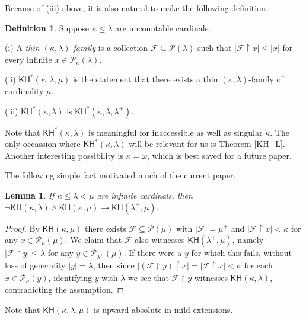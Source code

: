 \documentclass[10pt,reqno]{amsart}
\theoremstyle{plain}
\newtheorem{lemma}[theorem]{Lemma}
\theoremstyle{definition}
\newtheorem{definition}[theorem]{Definition}
\theoremstyle{remark}
\begin{document}
Because of (iii) above, it is also natural to make the following definition. 

\begin{definition}\label{KH*}
Suppose $\kappa\leq\lambda$ are uncountable cardinals.

(i) A \textit{thin $(\kappa,\lambda)$-family} is a collection $\mathcal{F}\subseteq\mathcal{P}(\lambda)$ such that $|\mathcal{F}\upharpoonright x|\leq|x|$ for every infinite $x\in\mathcal{P}_\kappa(\lambda)$.

(ii) $\mathsf{KH}^*(\kappa,\lambda,\mu)$ is the statement that there exists a thin $(\kappa,\lambda)$-family of cardinality $\mu$.

(iii) $\mathsf{KH}^*(\kappa,\lambda)$ is $\mathsf{KH}^*(\kappa,\lambda,\lambda^+)$.
\end{definition}

Note that $\mathsf{KH}^*(\kappa,\lambda)$ is meaningful for inaccessible as well as singular $\kappa$. The only occassion where $\mathsf{KH}^*(\kappa,\lambda)$ will be relevant for us is Theorem \ref{KH_L}. Another interesting possibility is $\kappa=\omega$, which is best saved for a future paper.


The following simple fact motivated much of the current paper.

\begin{lemma}\label{KH_constraint}
If $\kappa\leq\lambda<\mu$ are infinite cardinals, then $\lnot\mathsf{KH}(\kappa,\lambda)\land
\mathsf{KH}(\kappa,\mu)\rightarrow\mathsf{KH}(\lambda^+,\mu)$.
\end{lemma}
\begin{proof}
By $\mathsf{KH}(\kappa,\mu)$ there exists $\mathcal{F}\subseteq\mathcal{P}(\mu)$ with $|\mathcal{F}|=\mu^+$ and $|\mathcal{F}\upharpoonright x|<\kappa$ for any $x\in\mathcal{P}_\kappa(\mu)$. We claim that $\mathcal{F}$ also witnesses $\mathsf{KH}(\lambda^+,\mu)$, namely $|\mathcal{F}\upharpoonright y|\leq\lambda$ for any $y\in\mathcal{P}_{\lambda^+}(\mu)$. If there were a $y$ for which this fails, without loss of generality $|y|=\lambda$, then since $|(\mathcal{F}\upharpoonright y)\upharpoonright x|=|\mathcal{F}\upharpoonright x|<\kappa$ for each $x\in\mathcal{P}_\kappa(y)$, identifying $y$ with $\lambda$ we see that $\mathcal{F}\upharpoonright y$ witnesses $\mathsf{KH}(\kappa,\lambda)$, contradicting the assumption.
\end{proof}




Note that $\mathsf{KH}(\kappa,\lambda,\mu)$ is upward absolute in mild extensions.
\end{document}
